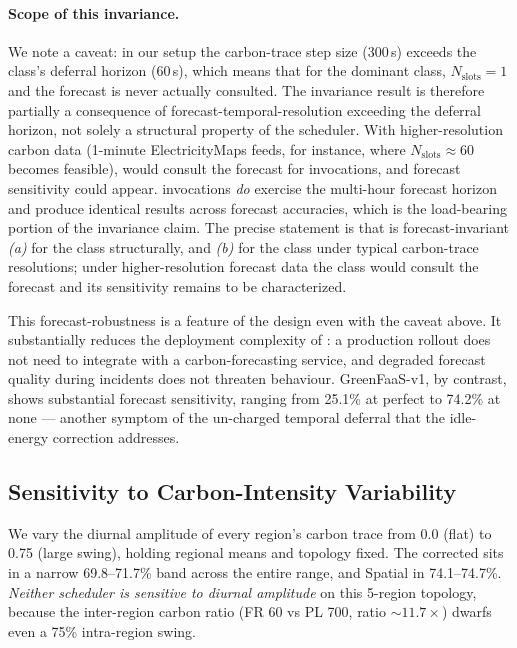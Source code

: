 \paragraph{Scope of this invariance.} We note a
caveat: in our setup the carbon-trace step size (300\,s) exceeds the
\Deferrable{} class's deferral horizon (60\,s), which means that for
the dominant \Deferrable{} class, $N_{\text{slots}} = 1$ and the
forecast is never actually consulted. The invariance result is
therefore partially a consequence of forecast-temporal-resolution
exceeding the deferral horizon, not solely a structural property of
the scheduler. With higher-resolution carbon data (1-minute
ElectricityMaps feeds, for instance, where $N_{\text{slots}} \approx
60$ becomes feasible), \GreenFaaS{} would consult the forecast for
\Deferrable{} invocations, and forecast sensitivity could appear.
\Background{} invocations \emph{do} exercise the multi-hour forecast
horizon and produce identical results across forecast accuracies,
which is the load-bearing portion of the invariance claim. The
precise statement is that \GreenFaaS{} is forecast-invariant
\emph{(a)} for the \Background{} class structurally, and
\emph{(b)} for the \Deferrable{} class under typical
carbon-trace resolutions; under higher-resolution forecast data the
\Deferrable{} class would consult the forecast and its sensitivity
remains to be characterized.

This forecast-robustness is a feature of the design even with the
caveat above. It substantially reduces the deployment complexity of
\GreenFaaS: a production rollout does not need to integrate with a
carbon-forecasting service, and degraded forecast quality during
incidents does not threaten behaviour. GreenFaaS-v1, by contrast,
shows substantial forecast sensitivity, ranging from 25.1\% at
\textsf{perfect} to 74.2\% at \textsf{none} --- another symptom of
the un-charged temporal deferral that the idle-energy correction
addresses.

\subsection{Sensitivity to Carbon-Intensity Variability}
\label{sec:evaluation:variability}

We vary the diurnal amplitude of every region's carbon trace from 0.0
(flat) to 0.75 (large swing), holding regional means and topology
fixed. The corrected \GreenFaaS{} sits in a narrow 69.8--71.7\% band
across the entire range, and Spatial in 74.1--74.7\%. \emph{Neither
scheduler is sensitive to diurnal amplitude} on this 5-region
topology, because the inter-region carbon ratio (FR 60 vs PL 700,
ratio $\sim 11.7\times$) dwarfs even a 75\% intra-region swing.

